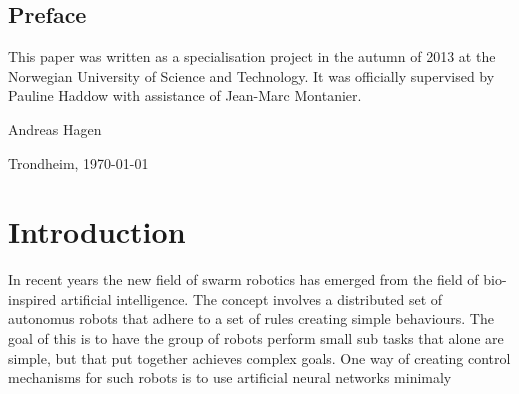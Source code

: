 \documentclass[a4paper]{book}
\newcommand{\thesisAuthor}{Andreas Hagen}
\begin{document}

\clearpage

\section*{Preface}



\vspace{1cm}

This paper was written as a specialisation project in the autumn of 2013 at the Norwegian University of Science and Technology. It was officially supervised by Pauline Haddow with assistance of Jean-Marc Montanier.

\vfill

\hfill \thesisAuthor

\hfill Trondheim, \today

\clearpage

\tableofcontents



\mainmatter

\chapter{Introduction}
\label{cha:Introduction}

In recent years the new field of swarm robotics has emerged from the field of bio-inspired artificial intelligence. The concept involves a distributed set of autonomus robots that adhere to a set of rules creating simple behaviours. The goal of this is to have the group of robots perform small sub tasks that alone are simple, but that put together achieves complex goals. 
One way of creating control mechanisms for such robots is to use artificial neural networks
 minimaly

\end{document}
